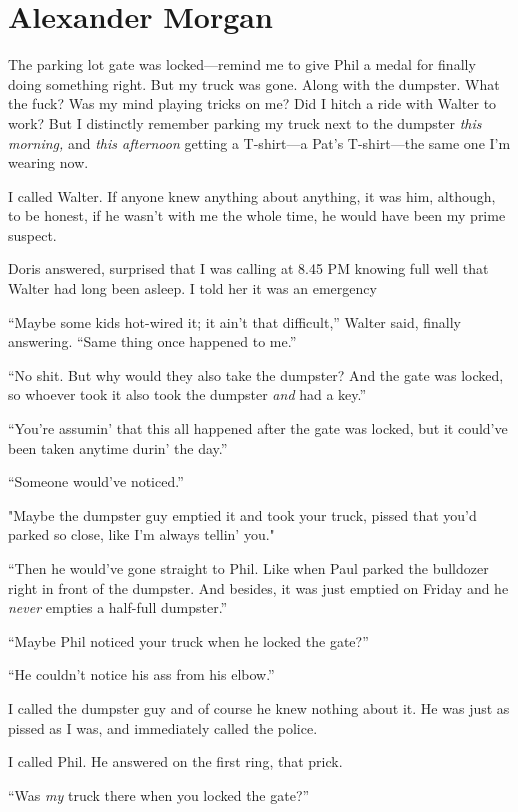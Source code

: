 \chapter{Alexander Morgan}

\titlemark

The parking lot gate was locked---remind me to give Phil a medal for
finally doing something right. But my truck was gone. Along with the
dumpster. What the fuck? Was my mind playing tricks on me? Did I hitch a
ride with Walter to work? But I distinctly remember parking my truck
next to the dumpster \emph{this morning,} and \emph{this afternoon}
getting a T-shirt---a Pat's T-shirt---the same one I'm wearing now.

I called Walter. If anyone knew anything about anything, it was him,
although, to be honest, if he wasn't with me the whole time, he would
have been my prime suspect.

Doris answered, surprised that I was calling at 8.45 PM knowing full
well that Walter had long been asleep. I told her it was an emergency

``Maybe some kids hot-wired it; it ain't that difficult,'' Walter said,
finally answering. ``Same thing once happened to me.''

``No shit. But why would they also take the dumpster? And the gate was
locked, so whoever took it also took the dumpster \emph{and} had a
key.''

``You're assumin' that this all happened after the gate was locked, but
it could've been taken anytime durin' the day.''

``Someone would've noticed.''

"Maybe the dumpster guy emptied it and took your truck, pissed that
you'd parked so close, like I'm always tellin' you."

``Then he would've gone straight to Phil. Like when Paul parked the
bulldozer right in front of the dumpster. And besides, it was just
emptied on Friday and he \emph{never} empties a half-full dumpster.''

``Maybe Phil noticed your truck when he locked the gate?''

``He couldn't notice his ass from his elbow.''

I called the dumpster guy and of course he knew nothing about it. He was
just as pissed as I was, and immediately called the police.

I called Phil. He answered on the first ring, that prick.

``Was \emph{my} truck there when you locked the gate?''

